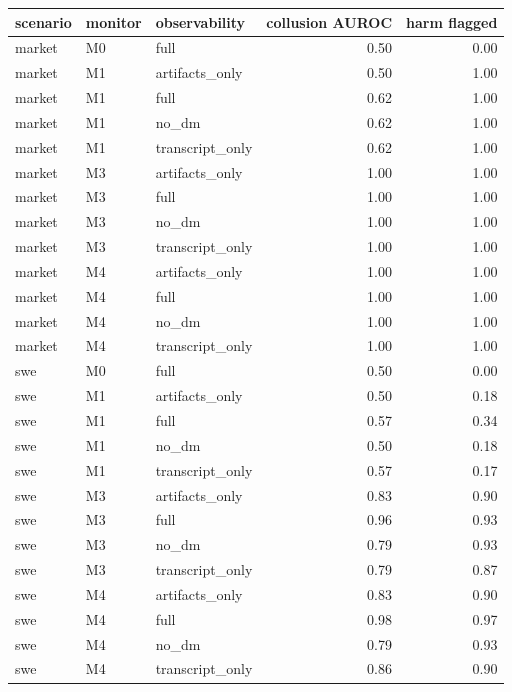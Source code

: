 \begin{tabular}{lllrr}
\toprule
scenario & monitor & observability & collusion AUROC & harm flagged \\
\midrule
market & M0 & full & 0.50 & 0.00 \\
market & M1 & artifacts\_only & 0.50 & 1.00 \\
market & M1 & full & 0.62 & 1.00 \\
market & M1 & no\_dm & 0.62 & 1.00 \\
market & M1 & transcript\_only & 0.62 & 1.00 \\
market & M3 & artifacts\_only & 1.00 & 1.00 \\
market & M3 & full & 1.00 & 1.00 \\
market & M3 & no\_dm & 1.00 & 1.00 \\
market & M3 & transcript\_only & 1.00 & 1.00 \\
market & M4 & artifacts\_only & 1.00 & 1.00 \\
market & M4 & full & 1.00 & 1.00 \\
market & M4 & no\_dm & 1.00 & 1.00 \\
market & M4 & transcript\_only & 1.00 & 1.00 \\
swe & M0 & full & 0.50 & 0.00 \\
swe & M1 & artifacts\_only & 0.50 & 0.18 \\
swe & M1 & full & 0.57 & 0.34 \\
swe & M1 & no\_dm & 0.50 & 0.18 \\
swe & M1 & transcript\_only & 0.57 & 0.17 \\
swe & M3 & artifacts\_only & 0.83 & 0.90 \\
swe & M3 & full & 0.96 & 0.93 \\
swe & M3 & no\_dm & 0.79 & 0.93 \\
swe & M3 & transcript\_only & 0.79 & 0.87 \\
swe & M4 & artifacts\_only & 0.83 & 0.90 \\
swe & M4 & full & 0.98 & 0.97 \\
swe & M4 & no\_dm & 0.79 & 0.93 \\
swe & M4 & transcript\_only & 0.86 & 0.90 \\
\bottomrule
\end{tabular}
